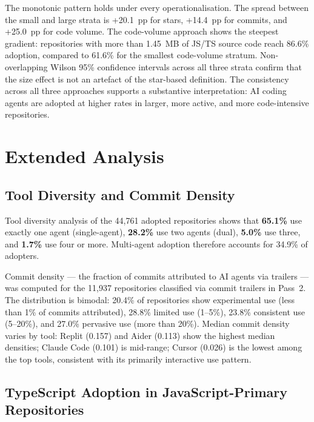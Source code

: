 The monotonic pattern holds under every operationalisation. The spread between the small and large strata is +20.1~pp for stars, +14.4~pp for commits, and +25.0~pp for code volume. The code-volume approach shows the steepest gradient: repositories with more than 1.45~MB of JS/TS source code reach 86.6\% adoption, compared to 61.6\% for the smallest code-volume stratum. Non-overlapping Wilson 95\% confidence intervals across all three strata confirm that the size effect is not an artefact of the star-based definition. The consistency across all three approaches supports a substantive interpretation: AI coding agents are adopted at higher rates in larger, more active, and more code-intensive repositories.

\section{Extended Analysis}
\label{sec:res:extended}

\subsection{Tool Diversity and Commit Density}

Tool diversity analysis of the 44,761 adopted repositories shows that \textbf{65.1\%} use exactly one agent (single-agent), \textbf{28.2\%} use two agents (dual), \textbf{5.0\%} use three, and \textbf{1.7\%} use four or more. Multi-agent adoption therefore accounts for 34.9\% of adopters.

Commit density --- the fraction of commits attributed to AI agents via trailers --- was computed for the 11,937 repositories classified via commit trailers in Pass~2. The distribution is bimodal: 20.4\% of repositories show experimental use (less than 1\% of commits attributed), 28.8\% limited use (1--5\%), 23.8\% consistent use (5--20\%), and 27.0\% pervasive use (more than 20\%). Median commit density varies by tool: Replit (0.157) and Aider (0.113) show the highest median densities; Claude Code (0.101) is mid-range; Cursor (0.026) is the lowest among the top tools, consistent with its primarily interactive use pattern.

\subsection{TypeScript Adoption in JavaScript-Primary Repositories}

